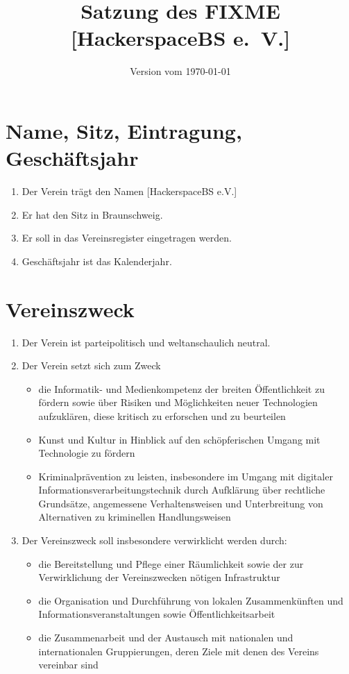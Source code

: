 \documentclass[a4paper,11pt]{scrartcl}
\title{Satzung des FIXME [HackerspaceBS e.~V.]}
\date{Version vom \today}
\begin{document}
\maketitle

\section{Name, Sitz, Eintragung, Geschäftsjahr}
\begin{enumerate}
  \item Der Verein trägt den Namen [HackerspaceBS e.V.]
  \item Er hat den Sitz in Braunschweig.
  \item Er soll in das Vereinsregister eingetragen werden.
  \item Geschäftsjahr ist das Kalenderjahr.
\end{enumerate}

\section{Vereinszweck}
\begin{enumerate}
  \item Der Verein ist parteipolitisch und weltanschaulich neutral.
  \item Der Verein setzt sich zum Zweck
  \begin{itemize}
    \item die Informatik- und Medienkompetenz der breiten Öffentlichkeit zu fördern 
      sowie über Risiken und Möglichkeiten neuer Technologien aufzuklären, diese 
      kritisch zu erforschen und zu beurteilen
    \item Kunst und Kultur in Hinblick auf den schöpferischen Umgang mit Technologie 
      zu fördern
    \item Kriminalprävention zu leisten, insbesondere im Umgang mit digitaler 
      Informationsverarbeitungstechnik durch Aufklärung über rechtliche 
      Grundsätze, angemessene Verhaltensweisen und Unterbreitung von Alternativen zu 
      kriminellen Handlungsweisen
  \end{itemize}
  \item Der Vereinszweck soll insbesondere verwirklicht werden durch:
    \begin{itemize}
      \item die Bereitstellung und Pflege einer Räumlichkeit sowie der zur 
        Verwirklichung der Vereinszwecken nötigen Infrastruktur
      \item die Organisation und Durchführung von lokalen Zusammenkünften und 
        Informationsveranstaltungen sowie Öffentlichkeitsarbeit
      \item die Zusammenarbeit und der Austausch mit nationalen und internationalen 
        Gruppierungen, deren Ziele mit denen des Vereins vereinbar sind
    \end{itemize}
\end{enumerate}
\end{document}
